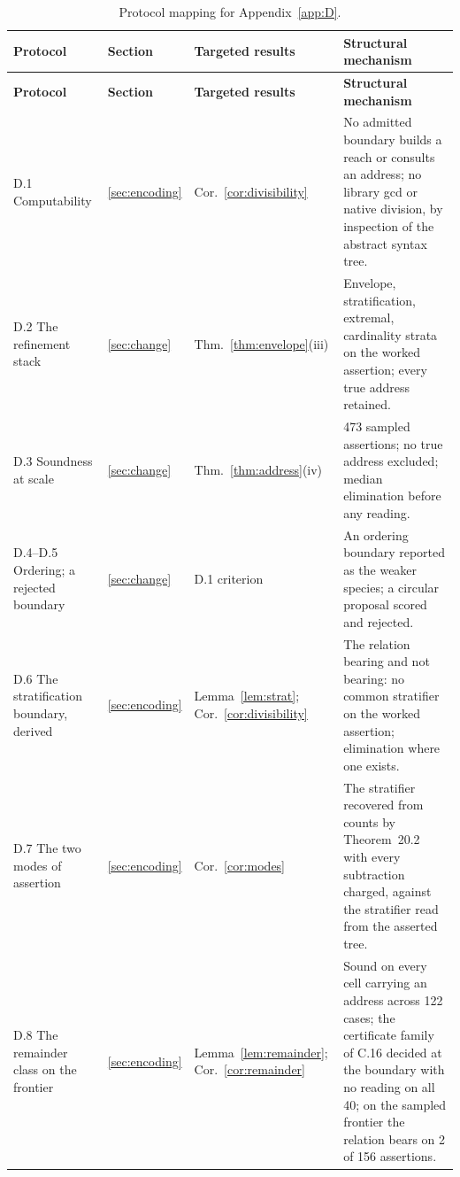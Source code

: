 \documentclass[pdflatex,sn-mathphys-num]{sn-jnl}
\theoremstyle{thmstyleone}%
\theoremstyle{thmstyletwo}%
\theoremstyle{thmstylethree}%
\begin{document}
\begin{appendices}
\begingroup\small\renewcommand{\arraystretch}{1.3}
\begin{longtable}{@{} p{} p{} p{} p{} @{}}
\caption{Protocol mapping for Appendix~\ref{app:D}.}\label{tab:appD_mapping}\\
\toprule
\textbf{Protocol} & \textbf{Section} & \textbf{Targeted results} & \textbf{Structural mechanism} \\
\midrule
\endfirsthead
\toprule
\textbf{Protocol} & \textbf{Section} & \textbf{Targeted results} & \textbf{Structural mechanism} \\
\midrule
\endhead
\bottomrule
\endfoot
D.1 Computability & \ref{sec:encoding} & Cor.~\ref{cor:divisibility} & No admitted boundary builds a reach or consults an address; no library gcd or native division, by inspection of the abstract syntax tree. \\
D.2 The refinement stack & \ref{sec:change} & Thm.~\ref{thm:envelope}(iii) & Envelope, stratification, extremal, cardinality strata on the worked assertion; every true address retained. \\
D.3 Soundness at scale & \ref{sec:change} & Thm.~\ref{thm:address}(iv) & 473 sampled assertions; no true address excluded; median elimination before any reading. \\
D.4--D.5 Ordering; a rejected boundary & \ref{sec:change} & D.1 criterion & An ordering boundary reported as the weaker species; a circular proposal scored and rejected. \\
D.6 The stratification boundary, derived & \ref{sec:encoding} & Lemma~\ref{lem:strat}; Cor.~\ref{cor:divisibility} & The relation bearing and not bearing: no common stratifier on the worked assertion; elimination where one exists. \\
D.7 The two modes of assertion & \ref{sec:encoding} & Cor.~\ref{cor:modes} & The stratifier recovered from counts by Theorem~20.2 with every subtraction charged, against the stratifier read from the asserted tree. \\
D.8 The remainder class on the frontier & \ref{sec:encoding} & Lemma~\ref{lem:remainder}; Cor.~\ref{cor:remainder} & Sound on every cell carrying an address across 122 cases; the certificate family of C.16 decided at the boundary with no reading on all 40; on the sampled frontier the relation bears on 2 of 156 assertions. \\
\end{longtable}\endgroup


\end{appendices}
\end{document}
